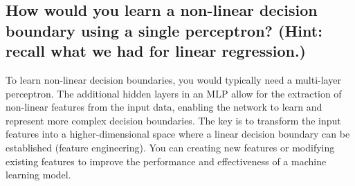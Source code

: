     \subsection{How would you learn a non-linear decision boundary using a single perceptron? (Hint: recall what we had for linear regression.)}

    To learn non-linear decision boundaries, you would typically need a multi-layer perceptron. The additional hidden layers in an MLP allow for the extraction of non-linear features from the input data, enabling the network to learn and represent more complex decision boundaries. The key is to transform the input features into a higher-dimensional space where a linear decision boundary can be established (feature engineering).
    You can creating new features or modifying existing features to improve the performance and effectiveness of a machine learning model.




